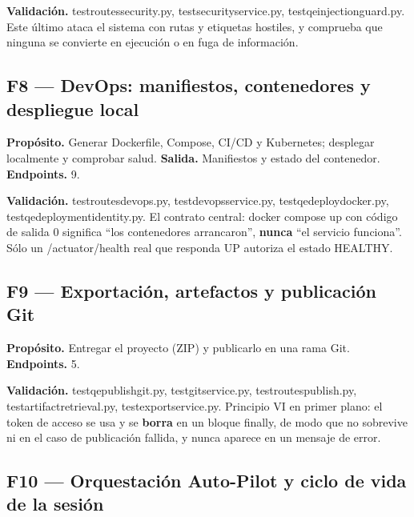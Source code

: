\documentclass[11pt,a4paper]{article}
\newcommand{\code}[1]{{\ttfamily\small\def\_{\textunderscore\allowbreak}#1}}
\begin{document}
\noindent\textbf{Validación.} \code{test\_routes\_security.py}, \code{test\_security\_service.py},
\code{test\_qe\_injection\_guard.py}. Este último ataca el sistema con rutas y etiquetas
hostiles, y comprueba que ninguna se convierte en ejecución o en fuga de información.

\subsection{F8 --- DevOps: manifiestos, contenedores y despliegue local}

\begin{finding}
\textbf{Propósito.} Generar Dockerfile, Compose, CI/CD y Kubernetes; desplegar localmente y
comprobar salud. \textbf{Salida.} Manifiestos y estado del contenedor. \textbf{Endpoints.} 9.
\end{finding}

\noindent\textbf{Validación.} \code{test\_routes\_devops.py}, \code{test\_devops\_service.py},
\code{test\_qe\_deploy\_docker.py}, \code{test\_qe\_deployment\_identity.py}. El contrato
central: \code{docker compose up} con código de salida 0 significa ``los contenedores
arrancaron'', \textbf{nunca} ``el servicio funciona''. Sólo un \code{/actuator/health} real que
responda \code{UP} autoriza el estado \code{HEALTHY}.

\subsection{F9 --- Exportación, artefactos y publicación Git}

\begin{finding}
\textbf{Propósito.} Entregar el proyecto (ZIP) y publicarlo en una rama Git.
\textbf{Endpoints.} 5.
\end{finding}

\noindent\textbf{Validación.} \code{test\_qe\_publish\_git.py}, \code{test\_git\_service.py},
\code{test\_routes\_publish.py}, \code{test\_artifact\_retrieval.py},
\code{test\_export\_service.py}. Principio VI en primer plano: el token de acceso se usa y se
\textbf{borra} en un bloque \code{finally}, de modo que no sobrevive ni en el caso de
publicación fallida, y nunca aparece en un mensaje de error.

\subsection{F10 --- Orquestación Auto-Pilot y ciclo de vida de la sesión}
\end{document}
